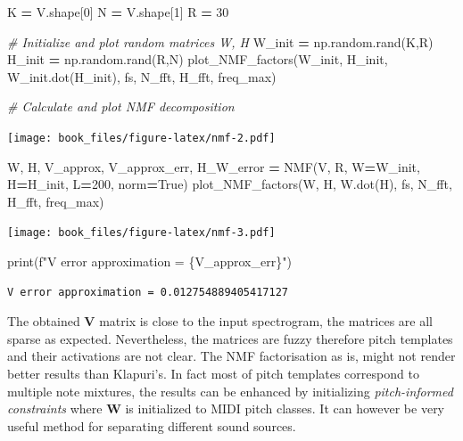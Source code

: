 \documentclass[american,]{article}
\newenvironment{Shaded}{\begin{snugshade}}{\end{snugshade}}
\newcommand{\BuiltInTok}[1]{#1}
\newcommand{\CommentTok}[1]{\textcolor[rgb]{0.56,0.35,0.01}{\textit{#1}}}
\newcommand{\DecValTok}[1]{\textcolor[rgb]{0.00,0.00,0.81}{#1}}
\newcommand{\NormalTok}[1]{#1}
\newcommand{\OperatorTok}[1]{\textcolor[rgb]{0.81,0.36,0.00}{\textbf{#1}}}
\newcommand{\SpecialCharTok}[1]{\textcolor[rgb]{0.00,0.00,0.00}{#1}}
\newcommand{\SpecialStringTok}[1]{\textcolor[rgb]{0.31,0.60,0.02}{#1}}
\newcommand{\VariableTok}[1]{\textcolor[rgb]{0.00,0.00,0.00}{#1}}
\begin{document}
\begin{Shaded}
\begin{Highlighting}[]
\NormalTok{K }\OperatorTok{=}\NormalTok{ V.shape[}\DecValTok{0}\NormalTok{]}
\NormalTok{N }\OperatorTok{=}\NormalTok{ V.shape[}\DecValTok{1}\NormalTok{]}
\NormalTok{R }\OperatorTok{=} \DecValTok{30}

\CommentTok{# Initialize and plot random matrices W, H}
\NormalTok{W_init }\OperatorTok{=}\NormalTok{ np.random.rand(K,R)}
\NormalTok{H_init }\OperatorTok{=}\NormalTok{ np.random.rand(R,N)}
\NormalTok{plot_NMF_factors(W_init, H_init, W_init.dot(H_init), fs, N_fft, H_fft, freq_max)}

\CommentTok{# Calculate and plot NMF decomposition}
\end{Highlighting}
\end{Shaded}

\texttt{[image: book\_files/figure-latex/nmf-2.pdf]}

\begin{Shaded}
\begin{Highlighting}[]
\NormalTok{W, H, V_approx, V_approx_err, H_W_error }\OperatorTok{=}\NormalTok{ NMF(V, R, W}\OperatorTok{=}\NormalTok{W_init, H}\OperatorTok{=}\NormalTok{H_init, L}\OperatorTok{=}\DecValTok{200}\NormalTok{, norm}\OperatorTok{=}\VariableTok{True}\NormalTok{)}
\NormalTok{plot_NMF_factors(W, H, W.dot(H), fs, N_fft, H_fft, freq_max)               }
\end{Highlighting}
\end{Shaded}

\texttt{[image: book\_files/figure-latex/nmf-3.pdf]}

\begin{Shaded}
\begin{Highlighting}[]
\BuiltInTok{print}\NormalTok{(}\SpecialStringTok{f"V error approximation = }\SpecialCharTok{\{}\NormalTok{V_approx_err}\SpecialCharTok{\}}\SpecialStringTok{"}\NormalTok{)}
\end{Highlighting}
\end{Shaded}

\begin{verbatim}
V error approximation = 0.012754889405417127
\end{verbatim}

The obtained \(\boldsymbol{V}\) matrix is close to the input spectrogram,
the matrices are all sparse as expected.
Nevertheless, the matrices are fuzzy therefore pitch templates
and their activations are not clear.
The NMF factorisation as is, might not render better results than Klapuri's.
In fact most of pitch templates correspond to multiple note mixtures,
the results can be enhanced by initializing \emph{pitch-informed constraints}
where \(\boldsymbol{W}\) is initialized to MIDI pitch classes.
It can however be very useful method for separating different sound sources.
\end{document}
